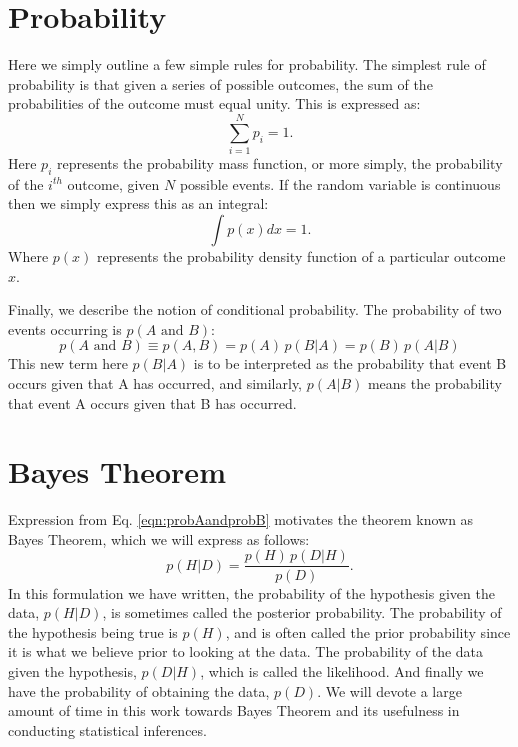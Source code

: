 \section{Probability}
Here we simply outline a few simple rules for probability. The simplest rule of probability is that given a series of possible outcomes, the sum of the probabilities of the outcome must equal unity. This is expressed as:
\begin{equation}\label{eqn:probsumdiscrete}
    \sum_{i=1}^{N} p_i = 1.
\end{equation}
Here $p_i$ represents the probability mass function, or more simply, the probability of the \textit{$i^{th}$} outcome, given $N$ possible events. If the random variable is continuous then we simply express this as an integral:
\begin{equation}\label{eqn:probsumcontinuous}
    \int p \left( x \right) dx = 1.
\end{equation}
Where $p(x)$ represents the probability density function of a particular outcome $x$.

Finally, we describe the notion of conditional probability. The probability of two events occurring is $p(A \textrm{ and } B)$:
\begin{equation}\label{eqn:probAandprobB}
    p\left(A\textrm{ and }B\right) \equiv p(A,B) = p(A) \, p(B|A) = p(B) \, p(A|B)
\end{equation}
This new term here $p(B|A)$ is to be interpreted as the probability that event B occurs given that A has occurred, and similarly, $p(A|B)$ means the probability that event A occurs given that B has occurred.

\section{Bayes Theorem}
Expression from Eq. \ref{eqn:probAandprobB} motivates the theorem known as Bayes Theorem, which we will express as follows:
\begin{equation} \label{eqn:BayesTheorem_basic}
     p(H|D) = \frac{p(H) \, p(D|H)}{p(D)}.
\end{equation}
In this formulation we have written, the probability of the hypothesis given the data, $p(H|D)$, is sometimes called the posterior probability. The probability of the hypothesis being true is $p(H)$, and is often called the prior probability since it is what we believe prior to looking at the data. The probability of the data given the hypothesis, $p(D|H)$, which is called the likelihood. And finally we have the probability of obtaining the data, $p(D)$. We will devote a large amount of time in this work towards Bayes Theorem and its usefulness in conducting statistical inferences.

